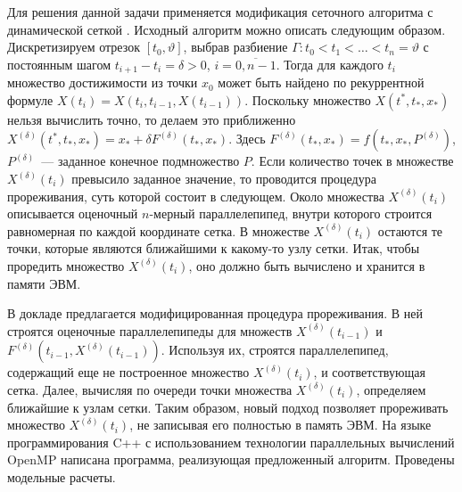 Для решения данной задачи применяется модификация сеточного алгоритма с динамической сеткой \cite{Ushak, Izm1,Izm2}. Исходный алгоритм можно описать следующим образом. Дискретизируем отрезок $[t_0,\vartheta]$, выбрав разбиение $\Gamma: t_0<t_1<\ldots<t_n=\vartheta$
с постоянным шагом $t_{i+1}-t_i=\delta>0$, $i=\overline{0,n-1}$.  Тогда для каждого $t_i$ множество достижимости из точки $x_0$ может быть найдено по рекуррентной формуле $X(t_i)=X(t_i,t_{i-1},X(t_{i-1}))$. Поскольку множество $X(t^*,t_*, x_*)$ нельзя вычислить точно, то делаем это приближенно $X^{(\delta)}(t^*,t_*, x_*)=x_*+\delta F^{(\delta)}(t_*,x_*)$.
Здесь $F^{(\delta)}(t_*,x_*)=f(t_*,x_*, P^{(\delta)})$, $P^{(\delta)}$~--- заданное конечное подмножество $P$. 
Если количество точек в множестве $X^{(\delta)}(t_i)$ превысило заданное значение, то проводится процедура прореживания, суть которой состоит в следующем. Около множества $X^{(\delta)}(t_i)$ описывается оценочный $n$-мерный параллелепипед, внутри которого строится равномерная по каждой координате сетка. В множестве $X^{(\delta)}(t_i)$ остаются те точки, которые являются ближайшими к какому-то узлу сетки.  Итак, чтобы проредить множество $X^{(\delta)}(t_i)$, оно должно быть вычислено и хранится в памяти ЭВМ.

В докладе предлагается модифицированная процедура прореживания. В ней строятся оценочные параллелепипеды для множеств $X^{(\delta)}(t_{i-1})$ и $F^{(\delta)}(t_{i-1},X^{(\delta)}(t_{i-1}))$. Используя их, строятся параллелепипед, содержащий еще не построенное множество $X^{(\delta)}(t_{i})$, и соответствующая сетка. Далее,  вычисляя по очереди точки множества $X^{(\delta)}(t_{i})$, определяем ближайшие к узлам сетки.
 Таким образом, новый подход позволяет прореживать множество $X^{(\delta)}(t_i)$, не записывая его полностью в память ЭВМ. На языке программирования C++ с использованием технологии параллельных вычислений OpenMP написана программа, реализующая предложенный алгоритм. Проведены модельные расчеты.





%

